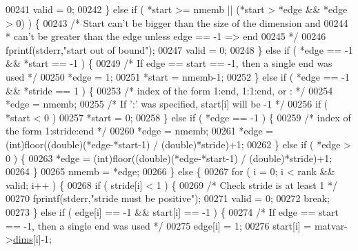 \begin{DoxyCode}
{{{{00241             valid = 0;
00242         \} \textcolor{keywordflow}{else} \textcolor{keywordflow}{if} ( *start >= nmemb || (*start > *edge && *edge > 0) ) \{
00243             \textcolor{comment}{/* Start can't be bigger than the size of the dimension and}
00244 \textcolor{comment}{             * can't be greater than the edge unless edge == -1 => end}
00245 \textcolor{comment}{             */}
00246             fprintf(stderr,\textcolor{stringliteral}{"start out of bound"});
00247             valid = 0;
00248         \} \textcolor{keywordflow}{else} \textcolor{keywordflow}{if} ( *edge == -1 && *start == -1 ) \{
00249             \textcolor{comment}{/* If edge == start == -1, then a single end was used */}
00250             *edge = 1;
00251             *start = nmemb-1;
00252         \} \textcolor{keywordflow}{else} \textcolor{keywordflow}{if} ( *edge == -1 && *stride == 1 ) \{
00253             \textcolor{comment}{/* index of the form 1:end, 1:1:end, or : */}
00254             *edge = nmemb;
00255             \textcolor{comment}{/* If ':' was specified, start[i] will be -1 */}
00256             \textcolor{keywordflow}{if} ( *start < 0 )
00257                 *start = 0;
00258         \} \textcolor{keywordflow}{else} \textcolor{keywordflow}{if} ( *edge == -1 ) \{
00259             \textcolor{comment}{/* index of the form 1:stride:end */}
00260             *edge = nmemb;
00261             *edge = (int)floor((\textcolor{keywordtype}{double})(*edge-*start-1) / (\textcolor{keywordtype}{double})*stride)+1;
00262         \} \textcolor{keywordflow}{else} \textcolor{keywordflow}{if} ( *edge > 0 ) \{
00263             *edge = (int)floor((\textcolor{keywordtype}{double})(*edge-*start-1) / (\textcolor{keywordtype}{double})*stride)+1;
00264         \}
00265         nmemb = *edge;
00266     \} \textcolor{keywordflow}{else} \{
00267         \textcolor{keywordflow}{for} ( i = 0; i < rank && valid; i++ ) \{
00268             \textcolor{keywordflow}{if} ( stride[i] < 1 ) \{
00269                 \textcolor{comment}{/* Check stride is at least 1 */}
00270                 fprintf(stderr,\textcolor{stringliteral}{"stride must be positive"});
00271                 valid = 0;
00272                 \textcolor{keywordflow}{break};
00273             \} \textcolor{keywordflow}{else} \textcolor{keywordflow}{if} ( edge[i] == -1 && start[i] == -1 ) \{
00274                 \textcolor{comment}{/* If edge == start == -1, then a single end was used */}
00275                 edge[i] = 1;
00276                 start[i] = matvar->\hyperlink{group___m_a_t_a8e01234e1c862ce3472bb37f5a09b92c}{dims}[i]-1;
}}}}
\end{DoxyCode}
